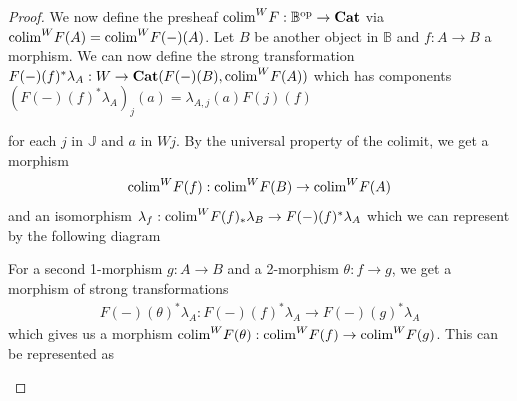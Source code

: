 \documentclass[12pt,oneside,reqno,a4paper]{article}
\theoremstyle{definition}
\newcommand{\op}{^\textup{op}}
\newcommand{\Cat}{\textbf{\textup{Cat}}}
\newcommand{\bB}{\mathbb{B}}
\newcommand{\bJ}{\mathbb{J}}
\newcommand{\colim}{\textup{colim}}
\begin{document}
\begin{proof}
We now define the presheaf $\colim^W F:\bB\op\to\Cat$ via $\colim^W F(A)=\colim^W F(-)(A)$. Let $B$ be another object in $\bB$ and $f:A\to B$ a morphism. We can now define the strong transformation $F(-)(f)^*\lambda_A:W\to \Cat(F(-)(B),\colim^W F(A))$ which has components $(F(-)(f)^*\lambda_A)_j(a)=\lambda_{A,j}(a)F(j)(f)$
\begin{center}
\end{center}
for each $j$ in $\bJ$ and $a$ in $Wj$. By the universal property of the colimit, we get a morphism 
\begin{align*}
\colim^W F(f):\colim^W F(B)\to\colim^W F(A)
\end{align*}
and an isomorphism $\lambda_f:\colim^W F(f)_*\lambda_B \to F(-)(f)^*\lambda_A$ which we can represent by the following diagram
\begin{center}
\end{center}
For a second 1-morphism $g:A\to B$ and a 2-morphism $\theta:f\to g$, we get a morphism of strong transformations
\begin{align*}
F(-)(\theta)^*\lambda_A:F(-)(f)^*\lambda_A\to F(-)(g)^*\lambda_A
\end{align*}
which gives us a morphism $\colim^W F(\theta):\colim^W F(f)\to \colim^W F(g)$. This can be represented as
\begin{center}
\end{center}
\end{proof}
\end{document}
